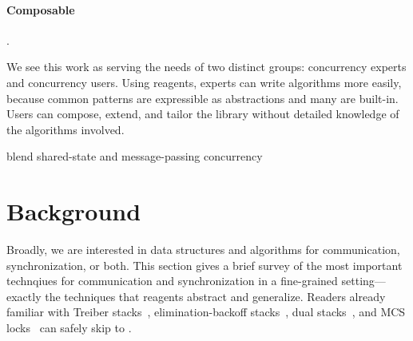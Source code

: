 \documentclass[preprint]{sigplanconf}
\newcommand{\elide}[1]{}
\begin{document}
\paragraph{Composable} .

We see this work as serving the needs of two distinct groups: concurrency
experts and concurrency users.  Using reagents, experts can write algorithms
more easily, because common patterns are expressible as abstractions and many
are built-in.  Users can compose, extend, and tailor the library without
detailed knowledge of the algorithms involved.

blend shared-state and message-passing concurrency


\elide{
# Contributions

  - make it easier to express fine-grained concurrent algorithms,
  including blocking operations etc.  make it possible to build them
  compositionally, which already happens in the literature but is
  largely unremarked upon.

  - we capture exponential backoff, elimination backoff, and other
  such patterns once and for all

  - can use flat combining as illustration of capturing very general
  concurrency abstraction

  - smooth blend of message-passing and shared-state concurrency
  isolation for shared state, coherent communication through messages,
  uniform blocking/synchronization

  - operational semantics

  - yields completely lock-free implementation of core CML

  - generalizes join calculus implementation, allowing dissolution
  even for existing channels

  - generalizes transactional events, but with more specialized
  implementation (doesn't need an underlying STM)

by no means a silver bullet.

why is this different from STM
}

\section{Background}

Broadly, we are interested in data structures and algorithms for
communication, synchronization, or both.  This section gives a brief
survey of the most important technqiues for communication and
synchronization in a fine-grained setting---exactly the techniques
that reagents abstract and generalize.  Readers already familiar with
Treiber stacks~\cite{?}, elimination-backoff stacks~\cite{?}, dual
stacks~\cite{?}, and MCS locks~\cite{?} can safely skip to
.
\end{document}
